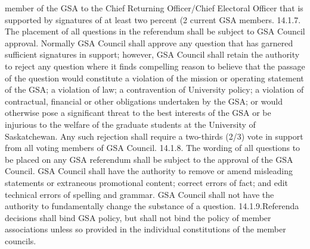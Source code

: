 member of the GSA to the Chief Returning Officer/Chief Electoral 
Officer that is supported by signatures of at least two percent (2%
current GSA members. 
14.1.7. The placement of all questions in the referendum shall be subject to 
GSA Council approval. Normally GSA Council shall approve any 
question that has garnered sufficient signatures in support; however, 
GSA Council shall retain the authority to reject any question where it 
finds compelling reason to believe that the passage of the question 
would constitute a violation of the mission or operating statement of 
the GSA; a violation of law; a contravention of University policy; a 
violation of contractual, financial or other obligations undertaken by 
the GSA; or would otherwise pose a significant threat to the best 
interests of the GSA or be injurious to the welfare of the graduate 
students at the University of Saskatchewan. Any such rejection shall 
require a two-thirds (2/3) vote in support from all voting members of 
GSA Council. 
14.1.8. The wording of all questions to be placed on any GSA referendum 
shall be subject to the approval of the GSA Council. GSA Council 
 shall have the authority to remove or amend misleading statements or 
 extraneous promotional content; correct errors of fact; and edit 
 technical errors of spelling and grammar. GSA Council shall not have 
 the authority to fundamentally change the substance of a question. 
14.1.9.Referenda decisions shall bind GSA policy, but shall not bind the 
 policy of member associations unless so provided in the individual 
 constitutions of the member councils. 